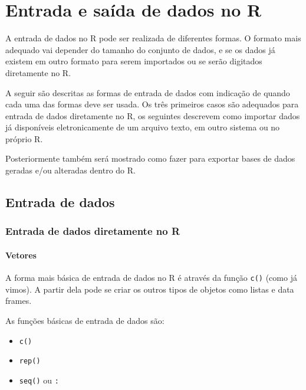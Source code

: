 \documentclass[
  10pt,
  a4paper]{book}
\providecommand{\tightlist}{%
  \setlength{\itemsep}{0pt}\setlength{\parskip}{0pt}}
\begin{document}
\hypertarget{entrada-e-sauxedda-de-dados-no-r}{%
\chapter{Entrada e saída de dados no R}\label{entrada-e-sauxedda-de-dados-no-r}}

A entrada de dados no R pode ser realizada de diferentes formas. O
formato mais adequado vai depender do tamanho do conjunto de dados, e se
os dados já existem em outro formato para serem importados ou se serão
digitados diretamente no R.

A seguir são descritas as formas de entrada de dados com
indicação de quando cada uma das formas deve ser usada. Os três
primeiros casos são adequados para entrada de dados diretamente no R, os
seguintes descrevem como importar dados já disponíveis eletronicamente de
um arquivo texto, em outro sistema ou no próprio R.

Posteriormente também será mostrado como fazer para exportar bases de
dados geradas e/ou alteradas dentro do R.

\hypertarget{entrada-de-dados}{%
\section{Entrada de dados}\label{entrada-de-dados}}

\hypertarget{entrada-de-dados-diretamente-no-r}{%
\subsection{Entrada de dados diretamente no R}\label{entrada-de-dados-diretamente-no-r}}

\hypertarget{vetores}{%
\subsubsection{Vetores}\label{vetores}}

A forma mais básica de entrada de dados no R é através da função \texttt{c()}
(como já vimos). A partir dela pode se criar os outros tipos de objetos
como listas e data frames.

As funções básicas de entrada de dados são:

\begin{itemize}
\tightlist
\item
  \texttt{c()}
\item
  \texttt{rep()}
\item
  \texttt{seq()} ou \texttt{:}
\end{itemize}
\end{document}
